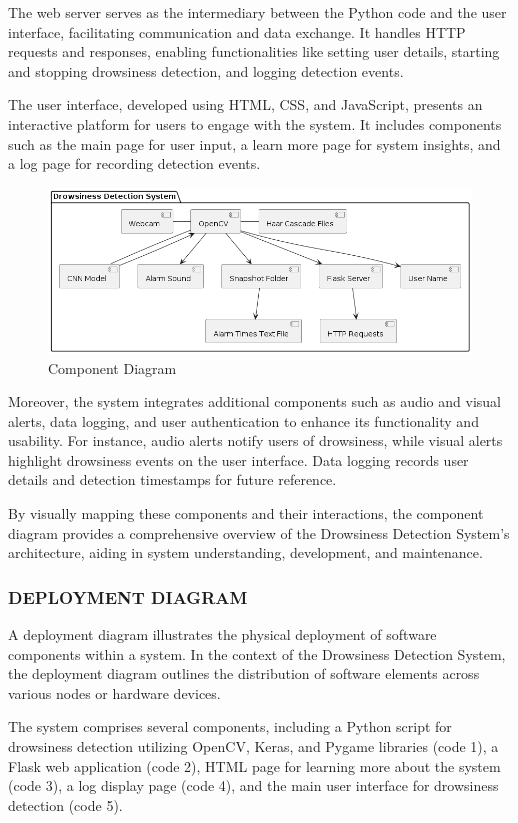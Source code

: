 \documentclass[12pt]{article}
\begin{document}
The web server serves as the intermediary between the Python code and the user interface, facilitating communication and data exchange. It handles HTTP requests and responses, enabling functionalities like setting user details, starting and stopping drowsiness detection, and logging detection events.

The user interface, developed using HTML, CSS, and JavaScript, presents an interactive platform for users to engage with the system. It includes components such as the main page for user input, a learn more page for system insights, and a log page for recording detection events.
\begin{figure}[h]
\centering
\includegraphics[width=1.0\textwidth]{CD}
\caption{Component Diagram}
\end{figure}
\FloatBarrier
Moreover, the system integrates additional components such as audio and visual alerts, data logging, and user authentication to enhance its functionality and usability. For instance, audio alerts notify users of drowsiness, while visual alerts highlight drowsiness events on the user interface. Data logging records user details and detection timestamps for future reference. 


By visually mapping these components and their interactions, the component diagram provides a comprehensive overview of the Drowsiness Detection System's architecture, aiding in system understanding, development, and maintenance.


\subsubsection{DEPLOYMENT DIAGRAM }
A deployment diagram illustrates the physical deployment of software components within a system. In the context of the Drowsiness Detection System, the deployment diagram outlines the distribution of software elements across various nodes or hardware devices.

The system comprises several components, including a Python script for drowsiness detection utilizing OpenCV, Keras, and Pygame libraries (code 1), a Flask web application (code 2), HTML page for learning more about the system (code 3), a log display page (code 4), and the main user interface for drowsiness detection (code 5).
\end{document}
